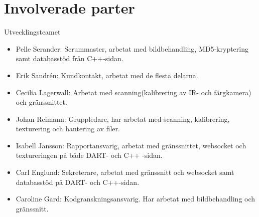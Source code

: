 \documentclass[a4paper,12pt,oneside,final]{extbook}
\begin{document}
\chapter{Involverade parter}
Utvecklingsteamet
\begin{itemize}
\item Pelle Serander: Scrummaster, arbetat med bildbehandling, MD5-kryptering samt databasstöd från C++-sidan.

\item Erik Sandrén: Kundkontakt, arbetat med de flesta delarna.

\item Cecilia Lagerwall: Arbetat med scanning(kalibrering av IR- och färgkamera) och gränssnittet.

\item Johan Reimann: Gruppledare, har arbetat med scanning, kalibrering, texturering och hantering av filer.

\item Isabell Jansson: Rapportansvarig, arbetat med gränssnittet, websocket och textureringen på både DART- och C++ -sidan.

\item Carl Englund: Sekreterare, arbetat med gränssnitt och websocket samt databasstöd på DART- och C++-sidan.

\item Caroline Gard: Kodgranskningsansvarig. Har arbetat med bildbehandling och gränssnitt.

\end{itemize}

\newpage
\end{document}

